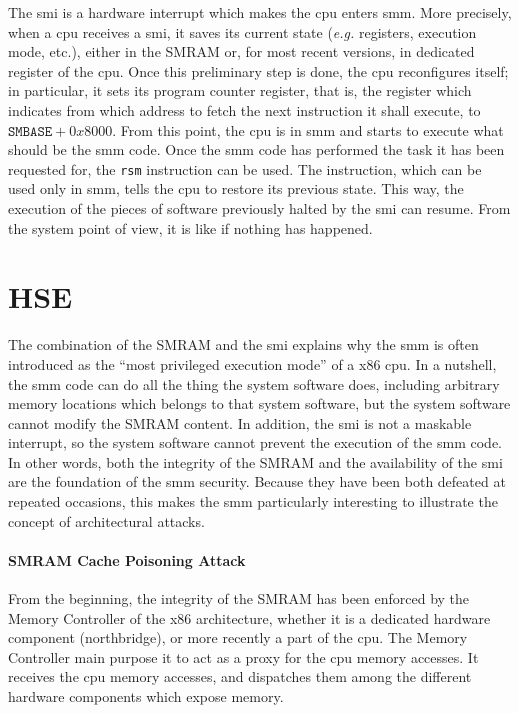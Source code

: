 The \ac{smi} is a hardware interrupt which makes the \ac{cpu} enters \ac{smm}.
%
More precisely, when a \ac{cpu} receives a \ac{smi}, it saves its current state
(\emph{e.g.} registers, execution mode, etc.), either in the SMRAM or, for most
recent versions, in dedicated register of the \ac{cpu}.
%
Once this preliminary step is done, the \ac{cpu} reconfigures itself;
%
in particular, it sets its program counter register, that is, the register which
indicates from which address to fetch the next instruction it shall execute, to
$\texttt{SMBASE} + 0x8000$.
%
From this point, the \ac{cpu} is in \ac{smm} and starts to execute what should
be the \ac{smm} code.
%
Once the \ac{smm} code has performed the task it has been requested for, the
\texttt{rsm} instruction can be used.
%
The instruction, which can be used only in \ac{smm}, tells the \ac{cpu} to
restore its previous state.
%
This way, the execution of the pieces of software previously halted by the
\ac{smi} can resume.
%
From the system point of view, it is like if nothing has happened.

\section{HSE}
\label{sec:usecase:hse}

The combination of the SMRAM and the \ac{smi} explains why the \ac{smm} is often
introduced as the ``most privileged execution mode'' of a x86 \ac{cpu}.
%
In a nutshell, the \ac{smm} code can do all the thing the system software does,
including arbitrary memory locations which belongs to that system software, but
the system software cannot modify the SMRAM content.
%
In addition, the \ac{smi} is not a maskable interrupt, so the system software
cannot prevent the execution of the \ac{smm} code.
%
In other words, both the integrity of the SMRAM and the availability of the
\ac{smi} are the foundation of the \ac{smm} security.
%
Because they have been both defeated at repeated occasions, this makes the \ac{smm}
particularly interesting to illustrate the concept of architectural attacks.

\paragraph{SMRAM Cache Poisoning Attack}
%
From the beginning, the integrity of the SMRAM has been enforced by the Memory
Controller of the x86 architecture, whether it is a dedicated hardware component
(northbridge), or more recently a part of the \ac{cpu}.
%
The Memory Controller main purpose it to act as a proxy for the \ac{cpu} memory
accesses.
%
It receives the \ac{cpu} memory accesses, and dispatches them among the
different hardware components which expose memory.

